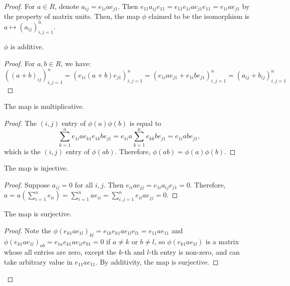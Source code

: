 \begin{proof}
  \leanok
  For $a \in R$, denote $a_{ij} = e_{1i}ae_{j1}$. Then $e_{11}a_{ij}e_{11} = e_{11}e_{1i}ae_{j1}e_{11} = e_{1i}ae_{j1}$ by the property of matrix units. Then, the map $\phi$ claimed to be the isomorphism is $a \mapsto (a_{ij})_{i,j=1}^n$.
  \begin{claim}
    $\phi$ is additive.
  \end{claim}
  \begin{proof}
    \leanok
    For $a, b \in R$, we have:
    $((a + b)_{ij})_{i,j=1}^n = (e_{1i}(a + b)e_{j1})_{i,j=1}^n = (e_{1i}ae_{j1} + e_{1i}be_{j1})_{i,j=1}^n = (a_{ij} + b_{ij})_{i,j=1}^n$
  \end{proof}
  \begin{claim}
    The map is multiplicative.
  \end{claim}
  \begin{proof}
    \leanok
    The $(i,j)$ entry of $\phi(a)\phi(b)$ is equal to
    $$
      \sum_{k=1}^n e_{1i}ae_{k1}e_{1k}be_{j1} = e_{1i}a \sum_{k=1}^n e_{kk} be_{j1} = e_{1i}abe_{j1},
    $$
    which is the $(i,j)$ entry of $\phi(ab)$. Therefore, $\phi(ab) = \phi(a)\phi(b)$.
  \end{proof}
  \begin{claim}
    The map is injective.
  \end{claim}
  \begin{proof}
    \leanok
    Suppose $a_{ij} = 0$ for all $i, j$. Then $e_{ii}ae_{jj} = e_{1i}a_{ij}e_{j1} = 0$. Therefore, $a = a(\sum_{i=1}^n e_{ii}) = \sum_{i=1}^n ae_{ii} = \sum_{i,j=1}^n e_{ii}ae_{jj} = 0$.
  \end{proof}
  \begin{claim}
    The map is surjective.
  \end{claim}
  \begin{proof}
    \leanok
    Note the $\phi(e_{k1}ae_{1l})_{kl} = e_{1k}e_{k1}a e_{1l}e_{l1} = e_{11}ae_{11}$ and $\phi(e_{k1}ae_{1l})_{ab} = e_{1a}e_{k1}a e_{1l}e_{b1} = 0$ if $a \neq k$ or $b \neq l$, so $\phi(e_{k1}ae_{1l})$ is a matrix whose all entries are zero, except the $k$-th and $l$-th entry is non-zero, and can take arbitrary value in $e_{11}ae_{11}$. By additivity, the map is surjective.
  \end{proof}
\end{proof}

